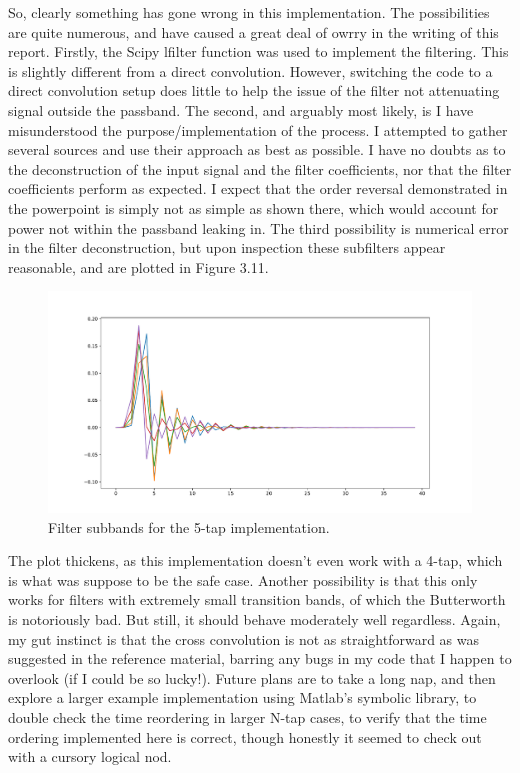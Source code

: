 \documentclass{report}
\begin{document}
So, clearly something has gone wrong in this implementation.  The possibilities are quite numerous, and have caused a great deal of owrry in the writing of this report.  Firstly, the Scipy lfilter function was used to implement the filtering.  This is slightly different from a direct convolution.  However, switching the code to a direct convolution setup does little to help the issue of the filter not attenuating signal outside the passband.  The second, and arguably most likely, is I have misunderstood the purpose/implementation of the process.  I attempted to gather several sources and use their approach as best as possible.  I have no doubts as to the deconstruction of the input signal and the filter coefficients, nor that the filter coefficients perform as expected.  I expect that the order reversal demonstrated in the powerpoint is simply not as simple as shown there, which would account for power not within the passband leaking in.  The third possibility is numerical error in the filter deconstruction, but upon inspection these subfilters appear reasonable, and are plotted in Figure 3.11.

\begin{figure}[!ht]
\includegraphics[scale=.4]{Figure_11.pdf}
\caption{Filter subbands for the 5-tap implementation.}
\end{figure} 

The plot thickens, as this implementation doesn't even work with a 4-tap, which is what was suppose to be the safe case.  Another possibility is that this only works for filters with extremely small transition bands, of which the Butterworth is notoriously bad.  But still, it should behave moderately well regardless.  Again, my gut instinct is that the cross convolution is not as straightforward as was suggested in the reference material, barring any bugs in my code that I happen to overlook (if I could be so lucky!).  Future plans are to take a long nap, and then explore a larger example implementation using Matlab's symbolic library, to double check the time reordering in larger N-tap cases, to verify that the time ordering implemented here is correct, though honestly it seemed to check out with a cursory logical nod.
\end{document}
